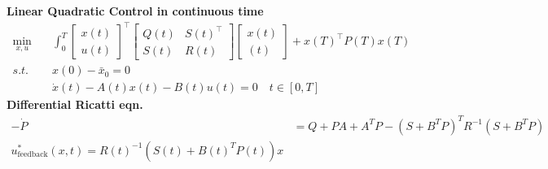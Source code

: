 \begin{tcolorbox}[colback=yellow!5!white,colframe=yellow!75!black,title=\textbf{Dynamic Programming}]
\textbf{Linear Quadratic Control in continuous time}
\begin{align*}
	\min_{x,u}\quad&
	\int_{0}^{T}
	\begin{bmatrix}
		x(t)\\ u(t)
	\end{bmatrix}^\top
	\begin{bmatrix}
		Q(t) & S(t)^\top\\ S(t) & R(t)
	\end{bmatrix}
	\begin{bmatrix}
		x(t)\\ (t)
	\end{bmatrix}
	+
	x(T)^\top P(T) x(T)\\
	s.t.\quad&
	x(0) - \bar{x}_0 = 0\\
	&\dot{x}(t) - A(t) x(t) - B(t) u(t) = 0 \quad  t \in [0, T]
\end{align*}
\textbf{Differential Ricatti eqn.}
\begin{align*}
  -\dot{P} &= Q + PA + A^TP - (S+B^TP)^TR^{-1}(S+B^TP) \\
  u_{\mathrm{feedback}}^*(x,t) = R(t)^{-1} (S(t) + B(t)^TP(t))x
               
\end{align*}
\end{tcolorbox}
